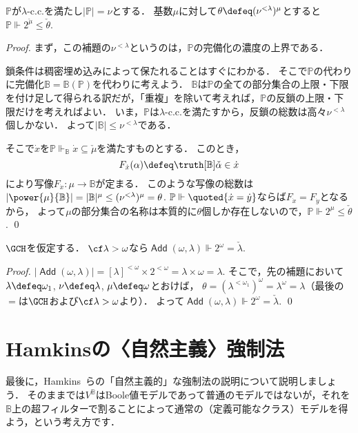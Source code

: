 \documentclass[a4j]{ltjsarticle}
\renewcommand{\Add}{\mathop{\mathsf{Add}}}
\begin{document}
\begin{lemma}
 $\mathbb{P}$が$\lambda$-c.c.を満たし$|\mathbb{P}| = \nu$とする．
 基数$\mu$に対して$\theta \defeq (\nu^{<\lambda})^\mu$とすると$\mathbb{P} \Vdash 2^{\check{\mu}} \leq \check{\theta}$.
\end{lemma}
\begin{proof}
 まず，この補題の$\nu^{<\lambda}$というのは，$\mathbb{P}$の完備化の濃度の上界である．

 鎖条件は稠密埋め込みによって保たれることはすぐにわかる．
 そこで$\mathbb{P}$の代わりに完備化$\mathbb{B} = \mathbb{B}(\mathbb{P})$を代わりに考えよう．
 $\mathbb{B}$は$\mathbb{P}$の全ての部分集合の上限・下限を付け足して得られる訳だが，「重複」を除いて考えれば，$\mathbb{P}$の反鎖の上限・下限だけを考えればよい．
 いま，$\mathbb{P}$は$\lambda$-c.c.を満たすから，反鎖の総数は高々$\nu^{<\lambda}$個しかない．
 よって$|\mathbb{B}| \leq \nu^{<\lambda}$である．

 そこで$\dot{x}$を$\mathbb{P} \Vdash_{\mathbb{B}} \dot{x} \subseteq \check{\mu}$を満たすものとする．
 このとき，
 \[
  F_{\dot{x}}(\alpha) \defeq \truth[\mathbb{B}]{\check{\alpha} \in \dot{x}}
 \]
 により写像$F_{\dot{x}}: \mu \to \mathbb{B}$が定まる．
 このような写像の総数は$|\power{\mu}{\mathbb{B}}| = |\mathbb{B}|^\mu \leq (\nu^{<\lambda})^\mu = \theta$.
 $\mathbb{P} \Vdash \quoted{\dot{x} = \dot{y}}$ならば$F_{\dot{x}} = F_{\dot{y}}$となるから，
 よって$\mu$の部分集合の名称は本質的に$\theta$個しか存在しないので，$\mathbb{P} \Vdash 2^{\mu} \leq \check{\theta}$. \qed
\end{proof}

\begin{corollary}
 $\GCH$を仮定する．
 $\cf \lambda > \omega$なら$\Add(\omega, \lambda) \Vdash 2^{\omega} = \check{\lambda}$.
\end{corollary}
\begin{proof}
 $|\Add(\omega, \lambda)| = [\lambda]^{<\omega} \times 2^{<\omega} = \lambda \times \omega = \lambda$.
 そこで，先の補題において$\lambda \defeq \omega_1$, $\nu \defeq \lambda$, $\mu \defeq \omega$とおけば，
 $\theta = (\lambda^{<\omega_1})^\omega = \lambda^\omega = \lambda$（最後の$=$は$\GCH$および$\cf \lambda > \omega$より）．
 よって$\Add(\omega, \lambda) \Vdash 2^\omega = \check{\lambda}.$ \qed
\end{proof}

\section{Hamkinsの〈自然主義〉強制法}
最後に，Hamkins~\cite{Hamkins:2012qv}らの「自然主義的」な強制法の説明について説明しましょう．
そのままでは$V^{\mathbb{B}}$はBoole値モデルであって普通のモデルではないが，それを$\mathbb{B}$上の超フィルターで割ることによって通常の（定義可能なクラス）モデルを得よう，という考え方です．
\end{document}
